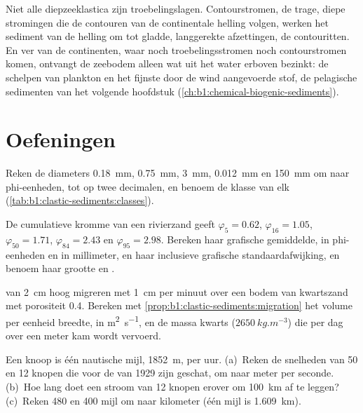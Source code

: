 Niet alle diepzeeklastica zijn troebelingslagen. Contourstromen, de trage, diepe stromingen die de contouren van de continentale helling volgen, werken het sediment van de helling om tot gladde, langgerekte afzettingen, de contouritten. En ver van de continenten, waar noch troebelingsstromen noch contourstromen komen, ontvangt de zeebodem alleen wat uit het water erboven bezinkt: de schelpen van plankton en het fijnste door de wind aangevoerde stof, de pelagische sedimenten van het volgende hoofdstuk (\cref{ch:b1:chemical-biogenic-sediments}).

\section{Oefeningen}

\begin{exercise}[$\star$]\label{exo:b1:clastic-sediments:1}
Reken de diameters \qty{0.18}{mm}, \qty{0.75}{mm}, \qty{3}{mm}, \qty{0.012}{mm} en \qty{150}{mm} om naar phi-eenheden, tot op twee decimalen, en benoem de klasse van elk (\cref{tab:b1:clastic-sediments:classes}).
\end{exercise}

\begin{exercise}[$\star$]\label{exo:b1:clastic-sediments:2}
De cumulatieve kromme van een rivierzand geeft $\varphi_5 = 0.62$, $\varphi_{16} =
1.05$, $\varphi_{50} = 1.71$, $\varphi_{84} = 2.43$ en $\varphi_{95} = 2.98$. Bereken haar grafische gemiddelde, in phi-eenheden en in millimeter, en haar inclusieve grafische standaardafwijking, en benoem haar grootte en .
\end{exercise}

\begin{exercise}[$\star$]\label{exo:b1:clastic-sediments:3}
 van \qty{2}{cm} hoog migreren met \qty{1}{cm} per minuut over een bodem van kwartszand met porositeit \num{0.4}. Bereken met \cref{prop:b1:clastic-sediments:migration} het volume  per eenheid breedte, in \si{m^2.s^{-1}}, en de massa kwarts ($\qty{2650}{kg.m^{-3}}$) die per dag over een meter kam wordt vervoerd.
\end{exercise}

\begin{exercise}[$\star$]\label{exo:b1:clastic-sediments:4}
Een knoop is één nautische mijl, \qty{1852}{m}, per uur. (a)~Reken de snelheden van 50 en 12 knopen die voor de  van 1929 zijn geschat, om naar meter per seconde. (b)~Hoe lang doet een stroom van 12 knopen erover om \qty{100}{km} af te leggen? (c)~Reken 480 en 400 mijl om naar kilometer (één mijl is \qty{1.609}{km}).
\end{exercise}

